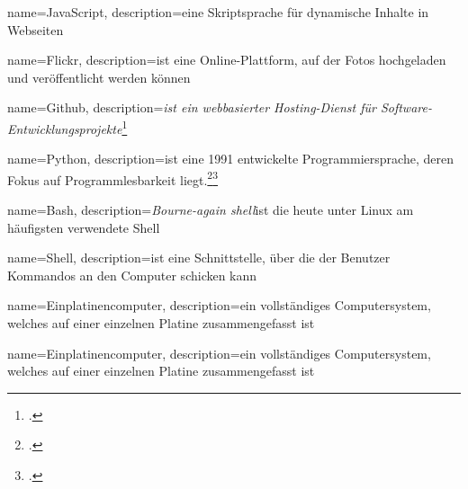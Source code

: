 
{
  name=JavaScript,
  description={eine Skriptsprache für dynamische Inhalte in Webseiten}
}

{
  name=Flickr,
  description={ist eine Online-Plattform, auf der Fotos hochgeladen und veröffentlicht werden können}
}

{
  name=Github,
  description={\emph{ist ein webbasierter Hosting-Dienst für Software-Entwicklungsprojekte}\footcite{wiki:github}}
}

{
  name=Python,
  description={ist eine 1991 entwickelte Programmiersprache, deren Fokus auf Programmlesbarkeit liegt.\footcite{python}\footcite{python_manual}{}}
}

{
  name=Bash,
  description={\textit{Bourne-again shell}\newline ist die heute unter Linux am häufigsten verwendete \gls{Shell}}
}

{
  name=Shell,
  description={ist eine Schnittstelle, über die der Benutzer Kommandos an den Computer schicken kann}
}

{
  name=Einplatinencomputer,
  description={ein vollständiges Computersystem, welches auf einer einzelnen Platine zusammengefasst ist}
}

{
  name=Einplatinencomputer,
  description={ein vollständiges Computersystem, welches auf einer einzelnen Platine zusammengefasst ist}
}


